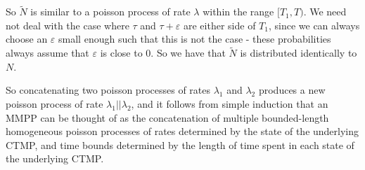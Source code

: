 So $\widetilde{N}$ is similar to a poisson process of rate $\lambda$ within the range $[T_1,T)$. We need not deal with the case where $\tau$ and $\tau+\varepsilon$ are either side of $T_1$, since we can always choose an $\varepsilon$ small enough such that this is not the case - these probabilities always assume that $\varepsilon$ is close to 0. So we have that $\widetilde{N}$ is distributed identically to $N$.

So concatenating two poisson processes of rates $\lambda_1$ and $\lambda_2$ produces a new poisson process of rate $\lambda_1||\lambda_2$, and it follows from simple induction that an MMPP can be thought of as the concatenation of multiple bounded-length homogeneous poisson processes of rates determined by the state of the underlying CTMP, and time bounds determined by the length of time spent in each state of the underlying CTMP.